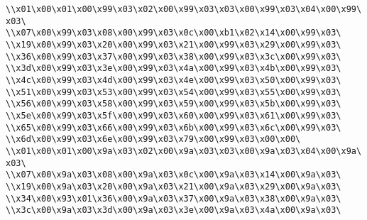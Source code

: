 \verb|\\x01\x00\x01\x00\x99\x03\x02\x00\x99\x03\x03\x00\x99\x03\x04\x00\x99\x03\|\newline
\verb|\\x07\x00\x99\x03\x08\x00\x99\x03\x0c\x00\xb1\x02\x14\x00\x99\x03\|\newline
\verb|\\x19\x00\x99\x03\x20\x00\x99\x03\x21\x00\x99\x03\x29\x00\x99\x03\|\newline
\verb|\\x36\x00\x99\x03\x37\x00\x99\x03\x38\x00\x99\x03\x3c\x00\x99\x03\|\newline
\verb|\\x3d\x00\x99\x03\x3e\x00\x99\x03\x4a\x00\x99\x03\x4b\x00\x99\x03\|\newline
\verb|\\x4c\x00\x99\x03\x4d\x00\x99\x03\x4e\x00\x99\x03\x50\x00\x99\x03\|\newline
\verb|\\x51\x00\x99\x03\x53\x00\x99\x03\x54\x00\x99\x03\x55\x00\x99\x03\|\newline
\verb|\\x56\x00\x99\x03\x58\x00\x99\x03\x59\x00\x99\x03\x5b\x00\x99\x03\|\newline
\verb|\\x5e\x00\x99\x03\x5f\x00\x99\x03\x60\x00\x99\x03\x61\x00\x99\x03\|\newline
\verb|\\x65\x00\x99\x03\x66\x00\x99\x03\x6b\x00\x99\x03\x6c\x00\x99\x03\|\newline
\verb|\\x6d\x00\x99\x03\x6e\x00\x99\x03\x79\x00\x99\x03\x00\x00\|\newline
\verb|\\x01\x00\x01\x00\x9a\x03\x02\x00\x9a\x03\x03\x00\x9a\x03\x04\x00\x9a\x03\|\newline
\verb|\\x07\x00\x9a\x03\x08\x00\x9a\x03\x0c\x00\x9a\x03\x14\x00\x9a\x03\|\newline
\verb|\\x19\x00\x9a\x03\x20\x00\x9a\x03\x21\x00\x9a\x03\x29\x00\x9a\x03\|\newline
\verb|\\x34\x00\x93\x01\x36\x00\x9a\x03\x37\x00\x9a\x03\x38\x00\x9a\x03\|\newline
\verb|\\x3c\x00\x9a\x03\x3d\x00\x9a\x03\x3e\x00\x9a\x03\x4a\x00\x9a\x03\|\newline
